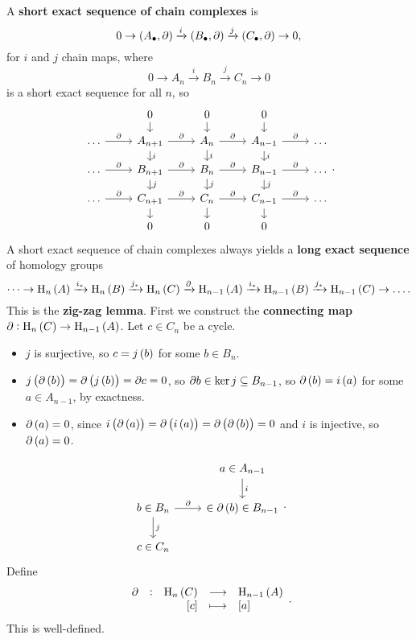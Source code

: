 A \textbf{short exact sequence of chain complexes} is
$$ 0 \to \br{A_\bullet, \da} \xrightarrow{i} \br{B_\bullet, \da} \xrightarrow{j} \br{C_\bullet, \da} \to 0, $$
for $ i $ and $ j $ chain maps, where
$$ 0 \to A_n \xrightarrow{i} B_n \xrightarrow{j} C_n \to 0 $$
is a short exact sequence for all $ n $, so
$$
\begin{tikzcd}[row sep=small]
& 0 \arrow{d} & 0 \arrow{d} & 0 \arrow{d} & \\
\dots \arrow{r}{\da} & A_{n + 1} \arrow{r}{\da} \arrow{d}{i} & A_n \arrow{r}{\da} \arrow{d}{i} & A_{n - 1} \arrow{r}{\da} \arrow{d}{i} & \dots \\
\dots \arrow{r}{\da} & B_{n + 1} \arrow{r}{\da} \arrow{d}{j} & B_n \arrow{r}{\da} \arrow{d}{j} & B_{n - 1} \arrow{r}{\da} \arrow{d}{j} & \dots \\
\dots \arrow{r}{\da} & C_{n + 1} \arrow{r}{\da} \arrow{d} & C_n \arrow{r}{\da} \arrow{d} & C_{n - 1} \arrow{r}{\da} \arrow{d} & \dots \\
& 0 & 0 & 0 &
\end{tikzcd}.
$$
A short exact sequence of chain complexes always yields a \textbf{long exact sequence} of homology groups
$$ \dots \to \H_n\br{A} \xrightarrow{i_*} \H_n\br{B} \xrightarrow{j_*} \H_n\br{C} \xrightarrow{\da} \H_{n - 1}\br{A} \xrightarrow{i_*} \H_{n - 1}\br{B} \xrightarrow{j_*} \H_{n - 1}\br{C} \to \dots. $$
This is the \textbf{zig-zag lemma}. First we construct the \textbf{connecting map} $ \da : \H_n\br{C} \to \H_{n - 1}\br{A} $. Let $ c \in C_n $ be a cycle.
\begin{itemize}
\item $ j $ is surjective, so $ c = j\br{b} $ for some $ b \in B_n $.
\item $ j\br{\da\br{b}} = \da\br{j\br{b}} = \da c = 0 $, so $ \partial b \in \ker j \subseteq B_{n - 1} $, so $ \da\br{b} = i\br{a} $ for some $ a \in A_{n - 1} $, by exactness.
\item $ \da\br{a} = 0 $, since $ i\br{\da\br{a}} = \da\br{i\br{a}} = \da\br{\da\br{b}} = 0 $ and $ i $ is injective, so $ \da\br{a} = 0 $.
\end{itemize}
$$
\begin{tikzcd}
& a \in A_{n - 1} \arrow{d}{i} \\
b \in B_n \arrow{r}{\da} \arrow{d}{j} & \in \da\br{b} \in B_{n - 1} \\
c \in C_n &
\end{tikzcd}.
$$
Define
$$ \function[\da]{\H_n\br{C}}{\H_{n - 1}\br{A}}{\sbr{c}}{\sbr{a}}. $$
This is well-defined.
